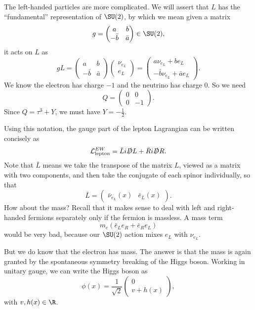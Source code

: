 \documentclass[a4paper]{article}
\begin{document}
The left-handed particles are more complicated. We will assert that $L$ has the ``fundamental'' representation of $\SU(2)$, by which we mean given a matrix
\[
  g = \begin{pmatrix}
    a & b\\
    -\bar{b} & \bar{a}
  \end{pmatrix}\in \SU(2),
\]
it acts on $L$ as
\[
  g L =
  \begin{pmatrix}
    a & b\\
    - \bar{b} & \bar{a}
  \end{pmatrix}
  \begin{pmatrix}
    \nu_{e_L}\\
    e_L
  \end{pmatrix} =
  \begin{pmatrix}
    a \nu_{e_L} + b e_L\\
    -\bar{b} \nu_{e_L} + \bar{a} e_L
  \end{pmatrix}.
\]
We know the electron has charge $-1$ and the neutrino has charge $0$. So we need
\[
  Q =
  \begin{pmatrix}
    0 & 0 \\
    0 & -1
  \end{pmatrix}.
\]
Since $Q = \tau^3 + Y$, we must have $Y = -\frac{1}{2}$.

Using this notation, the gauge part of the lepton Lagrangian can be written concisely as
\[
  \mathcal{L}_{\mathrm{lepton}}^{EW} = \bar L i \slashed D L + \bar R i \slashed D R.
\]
Note that $\bar{L}$ means we take the transpose of the matrix $L$, viewed as a matrix with two components, and then take the conjugate of each spinor individually, so that
\[
  \bar{L} =
  \begin{pmatrix}
    \bar{\nu}_{e_L}(x) & \bar{e}_L(x)
  \end{pmatrix}.
\]
How about the mass? Recall that it makes sense to deal with left and right-handed fermions separately only if the fermion is massless. A mass term
\[
  m_e (\bar{e}_Le_R + \bar{e}_R e_L)
\]
would be very bad, because our $\SU(2)$ action mixes $e_L$ with $\nu_{e_L}$.

But we do know that the electron has mass. The answer is that the mass is again granted by the spontaneous symmetry breaking of the Higgs boson. Working in unitary gauge, we can write the Higgs boson as
\[
  \phi(x) = \frac{1}{\sqrt{2}}
  \begin{pmatrix}
    0\\
    v + h(x)
  \end{pmatrix},
\]
with $v, h(x) \in \R$.
\end{document}
